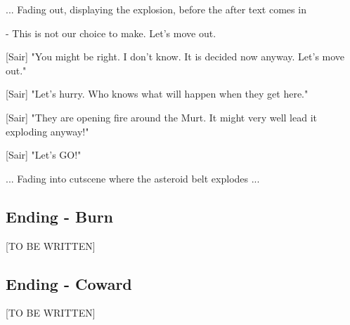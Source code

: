 \documentclass[a4paper,12pt]{article}
\begin{document}
... Fading out, displaying the explosion, before the after text comes in

- This is not our choice to make. Let's move out.

[Sair] "You might be right. I don't know. It is decided now anyway. Let's move out."

[Sair] "Let's hurry. Who knows what will happen when they get here."

[Sair] "They are opening fire around the Murt. It might very well lead it exploding anyway!"

[Sair] "Let's GO!"

... Fading into cutscene where the asteroid belt explodes ...

\subsection{Ending -  Burn}

[TO BE WRITTEN]

\subsection{Ending -  Coward}

[TO BE WRITTEN]
\end{document}
